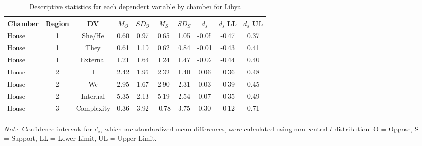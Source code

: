 \documentclass[
  english,
  ,man,floatsintext]{apa6}
\begin{document}
\begin{table}[tbp]

\begin{center}
\begin{threeparttable}

\caption{\label{tab:Ltable}Descriptive statistics for each dependent variable by chamber for Libya}

\small{

\begin{tabular}{lccccccccc}
\toprule
Chamber & Region & DV & $M_O$ & $SD_O$ & $M_S$ & $SD_S$ & $d_s$ & $d_s$ LL & $d_s$ UL\\
\midrule
House & 1 & She/He & 0.60 & 0.97 & 0.65 & 1.05 & -0.05 & -0.47 & 0.37\\
House & 1 & They & 0.61 & 1.10 & 0.62 & 0.84 & -0.01 & -0.43 & 0.41\\
House & 1 & External & 1.21 & 1.63 & 1.24 & 1.47 & -0.02 & -0.44 & 0.40\\
House & 2 & I & 2.42 & 1.96 & 2.32 & 1.40 & 0.06 & -0.36 & 0.48\\
House & 2 & We & 2.95 & 1.67 & 2.90 & 2.31 & 0.03 & -0.39 & 0.45\\
House & 2 & Internal & 5.35 & 2.13 & 5.19 & 2.54 & 0.07 & -0.35 & 0.49\\
House & 3 & Complexity & 0.36 & 3.92 & -0.78 & 3.75 & 0.30 & -0.12 & 0.71\\
\bottomrule
\addlinespace
\end{tabular}

}

\begin{tablenotes}[para]
\normalsize{\textit{Note.} Confidence intervals for $d_s$, which are standardized mean differences, were calculated using 
          non-central $t$ distribution. O = Oppose, S = Support, LL = Lower Limit, UL = Upper Limit.}
\end{tablenotes}

\end{threeparttable}
\end{center}

\end{table}
\end{document}
